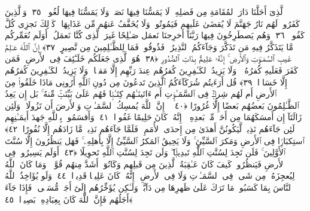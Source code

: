  ٱلَّذِىٓ أَحَلَّنَا دَارَ ٱلمُقَامَةِ مِن فَضلِهِۦ لَا يَمَسُّنَا فِيهَا نَصَبٌۭ وَلَا يَمَسُّنَا فِيهَا لُغُوبٌۭ ﴿٣٥﴾
 وَٱلَّذِينَ كَفَرُوا۟ لَهُم نَارُ جَهَنَّمَ لَا يُقضَىٰ عَلَيهِم فَيَمُوتُوا۟ وَلَا يُخَفَّفُ عَنهُم مِّن عَذَابِهَا ۚ كَذَٟلِكَ نَجزِى كُلَّ كَفُورٍۢ ﴿٣٦﴾
 وَهُم يَصطَرِخُونَ فِيهَا رَبَّنَآ أَخرِجنَا نَعمَل صَـٰلِحًا غَيرَ ٱلَّذِى كُنَّا نَعمَلُ ۚ أَوَلَم نُعَمِّركُم مَّا يَتَذَكَّرُ فِيهِ مَن تَذَكَّرَ وَجَآءَكُمُ ٱلنَّذِيرُ ۖ فَذُوقُوا۟ فَمَا لِلظَّـٰلِمِينَ مِن نَّصِيرٍ ﴿٣٧﴾
 إِنَّ ٱللَّهَ عَـٰلِمُ غَيبِ ٱلسَّمَـٰوَٟتِ وَٱلأَرضِ ۚ إِنَّهُۥ عَلِيمٌۢ بِذَاتِ ٱلصُّدُورِ ﴿٣٨﴾
 هُوَ ٱلَّذِى جَعَلَكُم خَلَـٰٓئِفَ فِى ٱلأَرضِ ۚ فَمَن كَفَرَ فَعَلَيهِ كُفرُهُۥ ۖ وَلَا يَزِيدُ ٱلكَـٰفِرِينَ كُفرُهُم عِندَ رَبِّهِم إِلَّا مَقتًۭا ۖ وَلَا يَزِيدُ ٱلكَـٰفِرِينَ كُفرُهُم إِلَّا خَسَارًۭا ﴿٣٩﴾
 قُل أَرَءَيتُم شُرَكَآءَكُمُ ٱلَّذِينَ تَدعُونَ مِن دُونِ ٱللَّهِ أَرُونِى مَاذَا خَلَقُوا۟ مِنَ ٱلأَرضِ أَم لَهُم شِركٌۭ فِى ٱلسَّمَـٰوَٟتِ أَم ءَاتَينَـٰهُم كِتَـٰبًۭا فَهُم عَلَىٰ بَيِّنَتٍۢ مِّنهُ ۚ بَل إِن يَعِدُ ٱلظَّـٰلِمُونَ بَعضُهُم بَعضًا إِلَّا غُرُورًا ﴿٤٠﴾
 ۞ إِنَّ ٱللَّهَ يُمسِكُ ٱلسَّمَـٰوَٟتِ وَٱلأَرضَ أَن تَزُولَا ۚ وَلَئِن زَالَتَآ إِن أَمسَكَهُمَا مِن أَحَدٍۢ مِّنۢ بَعدِهِۦٓ ۚ إِنَّهُۥ كَانَ حَلِيمًا غَفُورًۭا ﴿٤١﴾
 وَأَقسَمُوا۟ بِٱللَّهِ جَهدَ أَيمَـٰنِهِم لَئِن جَآءَهُم نَذِيرٌۭ لَّيَكُونُنَّ أَهدَىٰ مِن إِحدَى ٱلأُمَمِ ۖ فَلَمَّا جَآءَهُم نَذِيرٌۭ مَّا زَادَهُم إِلَّا نُفُورًا ﴿٤٢﴾
 ٱستِكبَارًۭا فِى ٱلأَرضِ وَمَكرَ ٱلسَّيِّئِ ۚ وَلَا يَحِيقُ ٱلمَكرُ ٱلسَّيِّئُ إِلَّا بِأَهلِهِۦ ۚ فَهَل يَنظُرُونَ إِلَّا سُنَّتَ ٱلأَوَّلِينَ ۚ فَلَن تَجِدَ لِسُنَّتِ ٱللَّهِ تَبدِيلًۭا ۖ وَلَن تَجِدَ لِسُنَّتِ ٱللَّهِ تَحوِيلًا ﴿٤٣﴾
 أَوَلَم يَسِيرُوا۟ فِى ٱلأَرضِ فَيَنظُرُوا۟ كَيفَ كَانَ عَـٰقِبَةُ ٱلَّذِينَ مِن قَبلِهِم وَكَانُوٓا۟ أَشَدَّ مِنهُم قُوَّةًۭ ۚ وَمَا كَانَ ٱللَّهُ لِيُعجِزَهُۥ مِن شَىءٍۢ فِى ٱلسَّمَـٰوَٟتِ وَلَا فِى ٱلأَرضِ ۚ إِنَّهُۥ كَانَ عَلِيمًۭا قَدِيرًۭا ﴿٤٤﴾
 وَلَو يُؤَاخِذُ ٱللَّهُ ٱلنَّاسَ بِمَا كَسَبُوا۟ مَا تَرَكَ عَلَىٰ ظَهرِهَا مِن دَآبَّةٍۢ وَلَـٰكِن يُؤَخِّرُهُم إِلَىٰٓ أَجَلٍۢ مُّسَمًّۭى ۖ فَإِذَا جَآءَ أَجَلُهُم فَإِنَّ ٱللَّهَ كَانَ بِعِبَادِهِۦ بَصِيرًۢا ﴿٤٥﴾
 
